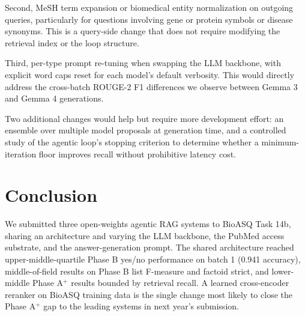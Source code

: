 \documentclass[sigconf,natbib=true]{ceurart}
\begin{document}
Second, MeSH term expansion or biomedical entity normalization on outgoing queries, particularly for questions involving gene or protein symbols or disease synonyms. This is a query-side change that does not require modifying the retrieval index or the loop structure.

Third, per-type prompt re-tuning when swapping the LLM backbone, with explicit word caps reset for each model's default verbosity. This would directly address the cross-batch ROUGE-2 F1 differences we observe between Gemma 3 and Gemma 4 generations.

Two additional changes would help but require more development effort: an ensemble over multiple model proposals at generation time, and a controlled study of the agentic loop's stopping criterion to determine whether a minimum-iteration floor improves recall without prohibitive latency cost.


\section{Conclusion}
\label{sec:conclusion}

We submitted three open-weights agentic RAG systems to BioASQ Task 14b, sharing an architecture and varying the LLM backbone, the PubMed access substrate, and the answer-generation prompt. The shared architecture reached upper-middle-quartile Phase B yes/no performance on batch 1 (0.941 accuracy), middle-of-field results on Phase B list F-measure and factoid strict, and lower-middle Phase A$^+$ results bounded by retrieval recall. A learned cross-encoder reranker on BioASQ training data is the single change most likely to close the Phase A$^+$ gap to the leading systems in next year's submission.






\end{document}
